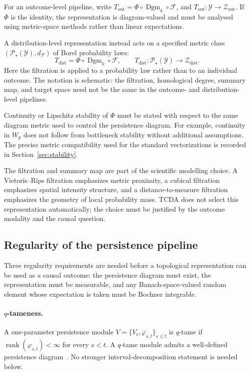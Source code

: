 \documentclass[11pt,a4paper]{article}
\theoremstyle{plain}
\theoremstyle{definition}
\theoremstyle{remark}
\newcommand{\1}{\mathbbm{1}}
\begin{document}
For an outcome-level pipeline, write
\(T_{\mathrm{out}} = \Phi\circ\operatorname{Dgm}_k\circ\mathcal F\), and
\(T_{\mathrm{out}}: \mathcal Y\longrightarrow\mathcal Z_{\mathrm{out}}\). If \(\Phi\) is the identity, the representation is diagram-valued and must be analysed using metric-space methods rather than linear expectations.

A distribution-level representation instead acts on a specified metric class \((\mathcal P_\star(\mathcal Y),d_{\mathcal P})\) of Borel probability laws:
\[
T_{\mathrm{dist}}
=
\Phi\circ\operatorname{Dgm}_k\circ\mathcal F,
\qquad
T_{\mathrm{dist}}:
\mathcal P_\star(\mathcal Y)
\longrightarrow
\mathcal Z_{\mathrm{dist}}.
\]
Here the filtration is applied to a probability law rather than to an individual outcome. The notation is schematic: the filtration, homological degree, summary map, and target space need not be the same in the outcome- and distribution-level pipelines.


Continuity or Lipschitz stability of \(\Phi\) must be stated with respect to the same diagram metric used to control the persistence diagram. For example, continuity in \(W_p\) does not follow from bottleneck stability without additional assumptions. The precise metric compatibility used for the standard vectorizations is recorded in Section~\ref{sec:stability}.

The filtration and summary map are part of the scientific modelling choice. A Vietoris--Rips filtration emphasizes metric proximity, a cubical filtration emphasizes spatial intensity structure, and a distance-to-measure filtration emphasizes the geometry of local probability mass. TCDA does not select this representation automatically; the choice must be justified by the outcome modality and the causal question.



\subsection{Regularity of the persistence pipeline}
\label{subsec:pipeline-regularity}

Three regularity requirements are needed before a topological
representation can be used as a causal outcome: the persistence diagram must exist, the representation must be measurable, and any Banach-space-valued random element whose expectation is taken must be Bochner integrable.

\paragraph{\(q\)-tameness.}
A one-parameter persistence module
\(V=\{V_t,\varphi_{s,t}\}_{s\leq t}\) is \(q\)-tame if
\(\operatorname{rank}(\varphi_{s,t})<\infty\) for every \(s<t\). A \(q\)-tame module admits a well-defined persistence diagram~\citep{oudot2015,chazaldesilvaglisseoudot2016}. No stronger interval-decomposition statement is needed below.
\end{document}
